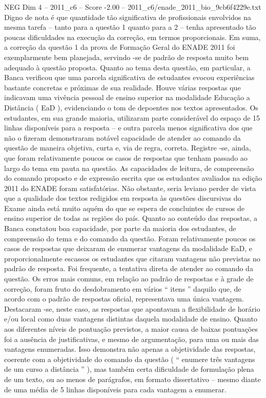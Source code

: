 \begin{textsample}{NEG Dim 4 – 2011\_c6 – Score -2.00 – 2011\_c6/enade\_2011\_bio\_9cb6f4229e.txt}
Digno de nota é que quantidade tão significativa de profissionais envolvidos na mesma tarefa – tanto para a questão 1 quanto para a 2 – tenha apresentado tão poucas dificuldades na execução da correção, em termos proporcionais.
Em suma, a correção da questão 1 da prova de Formação Geral do ENADE 2011 foi exemplarmente bem planejada, servindo -se de padrão de resposta muito bem adequado à questão proposta.
Quanto ao tema desta questão, em particular, a Banca verificou que uma parcela significativa de estudantes evocou experiências bastante concretas e próximas de sua realidade.
Houve várias respostas que indicavam uma vivência pessoal de ensino superior na modalidade Educação a Distância ( EaD ), evidenciando o tom de depoentes nos textos apresentados.
Os estudantes, em sua grande maioria, utilizaram parte considerável do espaço de 15 linhas disponíveis para a resposta – e outra parcela menos significativa dos que não o fizeram demonstraram notável capacidade de atender ao comando da questão de maneira objetiva, curta e, via de regra, correta.
Registre -se, ainda, que foram relativamente poucos os casos de respostas que tenham passado ao largo do tema em pauta na questão.
As capacidades de leitura, de compreensão do comando proposto e de expressão escrita que os estudantes avaliados na edição 2011 do ENADE foram satisfatórias.
Não obstante, seria leviano perder de vista que a qualidade dos textos redigidos em resposta às questões discursivas do Exame ainda está muito aquém do que se espera de concluintes de cursos de ensino superior de todas as regiões do país.
Quanto ao conteúdo das respostas, a Banca constatou boa capacidade, por parte da maioria dos estudantes, de compreensão do tema e do comando da questão.
Foram relativamente poucos os casos de respostas que deixaram de enumerar vantagens da modalidade EaD, e proporcionalmente escassos os estudantes que citaram vantagens não previstas no padrão de resposta.
Foi frequente, a tentativa direta de atender ao comando da questão.
Os erros mais comuns, em relação ao padrão de respostas e à grade de correção, foram fruto do desdobramento em vários “ itens ” daquilo que, de acordo com o padrão de respostas oficial, representava uma única vantagem.
Destacaram -se, neste caso, as respostas que apontavam a flexibilidade de horário e/ou local como duas vantagens distintas daquela modalidade de ensino.
Quanto aos diferentes níveis de pontuação previstos, a maior causa de baixas pontuações foi a ausência de justificativas, e mesmo de argumentação, para uma ou mais das vantagens enumeradas.
Isso demonstra não apenas a objetividade das respostas, coerente com a objetividade do comando da questão ( “ enumere três vantagens de um curso a distância ” ), mas também certa dificuldade de formulação plena de um texto, ou ao menos de parágrafos, em formato dissertativo – mesmo diante de uma média de 5 linhas disponíveis para cada vantagem a enumerar.

\end{textsample}
